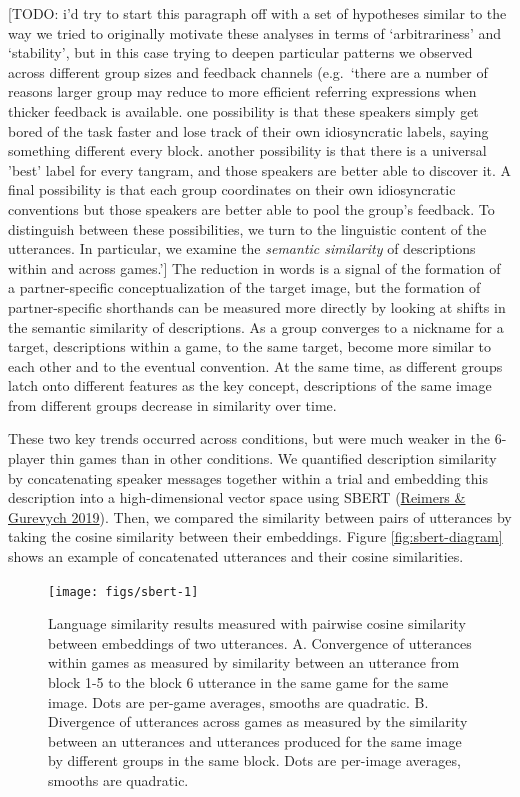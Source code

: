 \documentclass[
  english,
  a4paper,
]{article}
\begin{document}
{[}TODO: i'd try to start this paragraph off with a set of hypotheses similar to the way we tried to originally motivate these analyses in terms of `arbitrariness' and `stability', but in this case trying to deepen particular patterns we observed across different group sizes and feedback channels (e.g.~`there are a number of reasons larger group may reduce to more efficient referring expressions when thicker feedback is available. one possibility is that these speakers simply get bored of the task faster and lose track of their own idiosyncratic labels, saying something different every block. another possibility is that there is a universal 'best' label for every tangram, and those speakers are better able to discover it. A final possibility is that each group coordinates on their own idiosyncratic conventions but those speakers are better able to pool the group's feedback. To distinguish between these possibilities, we turn to the linguistic content of the utterances. In particular, we examine the \emph{semantic similarity} of descriptions within and across games.'{]}
The reduction in words is a signal of the formation of a partner-specific conceptualization of the target image, but the formation of partner-specific shorthands can be measured more directly by looking at shifts in the semantic similarity of descriptions. As a group converges to a nickname for a target, descriptions within a game, to the same target, become more similar to each other and to the eventual convention. At the same time, as different groups latch onto different features as the key concept, descriptions of the same image from different groups decrease in similarity over time.

These two key trends occurred across conditions, but were much weaker in the 6-player thin games than in other conditions. We quantified description similarity by concatenating speaker messages together within a trial and embedding this description into a high-dimensional vector space using SBERT (\protect\hyperlink{ref-reimers2019}{Reimers \& Gurevych 2019}). Then, we compared the similarity between pairs of utterances by taking the cosine similarity between their embeddings. Figure \ref{fig:sbert-diagram} shows an example of concatenated utterances and their cosine similarities.

\begin{figure}[t!]

{\centering \texttt{[image: figs/sbert-1]} 

}

\caption{Language similarity results measured with pairwise cosine similarity between embeddings of two utterances. A. Convergence of utterances within games as measured by similarity between an utterance from block 1-5 to the block 6 utterance in the same game for the same image. Dots are per-game averages, smooths are quadratic. B. Divergence of utterances across games as measured by the similarity between an utterances and utterances produced for the same image by different groups in the same block. Dots are per-image averages, smooths are quadratic.}\label{fig:sbert}
\end{figure}
\end{document}
